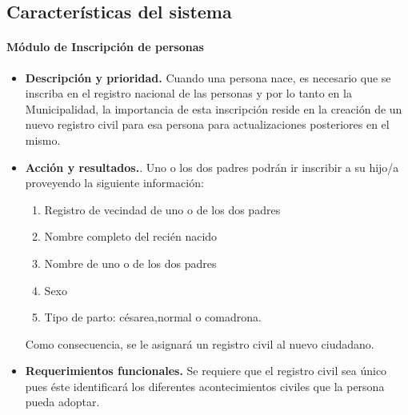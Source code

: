 \subsection{Caracter\'{i}sticas del sistema}

\paragraph{M\'{o}dulo de Inscripci\'{o}n de personas}
\begin{itemize}
\item \textbf{Descripci\'{o}n y prioridad.} Cuando una persona nace, es necesario que se inscriba en el registro nacional de las personas y por lo tanto en la Municipalidad, la importancia de esta inscripci\'{o}n reside en la creaci\'{o}n de un nuevo registro civil para esa persona para actualizaciones posteriores en el mismo. 

\item \textbf{Acci\'{o}n y resultados.}. Uno o los dos padres podr\'{a}n ir inscribir a su hijo/a proveyendo la siguiente informaci\'{o}n:
\begin{enumerate}
	\item Registro de vecindad de uno o de los dos padres
	\item Nombre completo del reci\'{e}n nacido
	\item Nombre de uno o de los dos padres
	\item Sexo
	\item Tipo de parto: c\'{e}sarea,normal o comadrona.
\end{enumerate}

Como consecuencia, se le asignar\'{a} un registro civil al nuevo ciudadano.

\item \textbf{Requerimientos funcionales.} Se requiere que el registro civil sea \'{u}nico pues \'{e}ste identificar\'{a} los diferentes acontecimientos civiles que la persona pueda adoptar.

\end{itemize}

